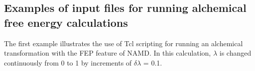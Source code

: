 \begin{itemize}

\end{itemize}



\subsection{Examples of input files for running alchemical free energy calculations}


The first example illustrates the use of {\sc Tcl} scripting for running
an alchemical transformation with the FEP feature of NAMD. In this
calculation, $\lambda$ is changed continuously from 0 to 1
by increments of $\delta \lambda$ = 0.1.


